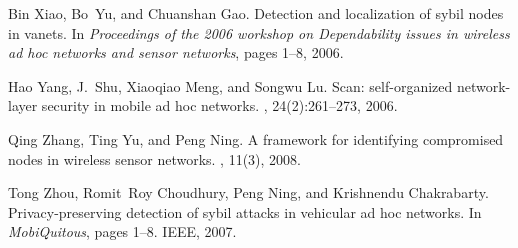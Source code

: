 \documentclass[conference]{IEEEtran}[10pt]
\begin{document}
\begin{thebibliography}{10}
Bin Xiao, Bo~Yu, and Chuanshan Gao.
\newblock Detection and localization of sybil nodes in vanets.
\newblock In {\em Proceedings of the 2006 workshop on Dependability issues in
  wireless ad hoc networks and sensor networks}, pages 1--8, 2006.

Hao Yang, J.~Shu, Xiaoqiao Meng, and Songwu Lu.
\newblock Scan: self-organized network-layer security in mobile ad hoc
  networks.
,
  24(2):261--273, 2006.

Qing Zhang, Ting Yu, and Peng Ning.
\newblock A framework for identifying compromised nodes in wireless sensor
  networks.
, 11(3), 2008.

Tong Zhou, Romit~Roy Choudhury, Peng Ning, and Krishnendu Chakrabarty.
\newblock Privacy-preserving detection of sybil attacks in vehicular ad hoc
  networks.
\newblock In {\em MobiQuitous}, pages 1--8. IEEE, 2007.

\end{thebibliography}
\end{document}
